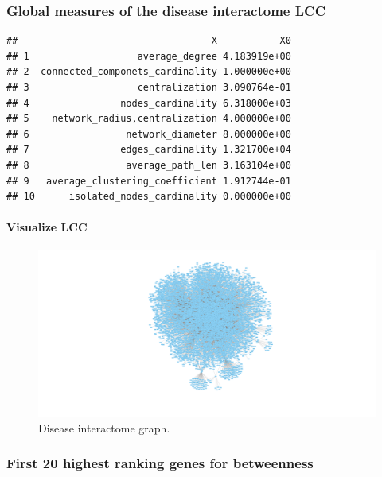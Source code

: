\documentclass[
]{article}
\begin{document}
\hypertarget{global-measures-of-the-disease-interactome-lcc}{%
\subsubsection{Global measures of the disease interactome
LCC}\label{global-measures-of-the-disease-interactome-lcc}}

\begin{verbatim}
##                                  X           X0
## 1                   average_degree 4.183919e+00
## 2  connected_componets_cardinality 1.000000e+00
## 3                   centralization 3.090764e-01
## 4                nodes_cardinality 6.318000e+03
## 5    network_radius,centralization 4.000000e+00
## 6                 network_diameter 8.000000e+00
## 7                edges_cardinality 1.321700e+04
## 8                 average_path_len 3.163104e+00
## 9   average_clustering_coefficient 1.912744e-01
## 10      isolated_nodes_cardinality 0.000000e+00
\end{verbatim}

\hypertarget{visualize-lcc}{%
\paragraph{Visualize LCC}\label{visualize-lcc}}

\begin{figure}
\centering
\includegraphics{g.graphml.png}
\caption{Disease interactome graph.}
\end{figure}

\hypertarget{first-20-highest-ranking-genes-for-betweenness}{%
\subsubsection{First 20 highest ranking genes for
betweenness}\label{first-20-highest-ranking-genes-for-betweenness}}
\end{document}
